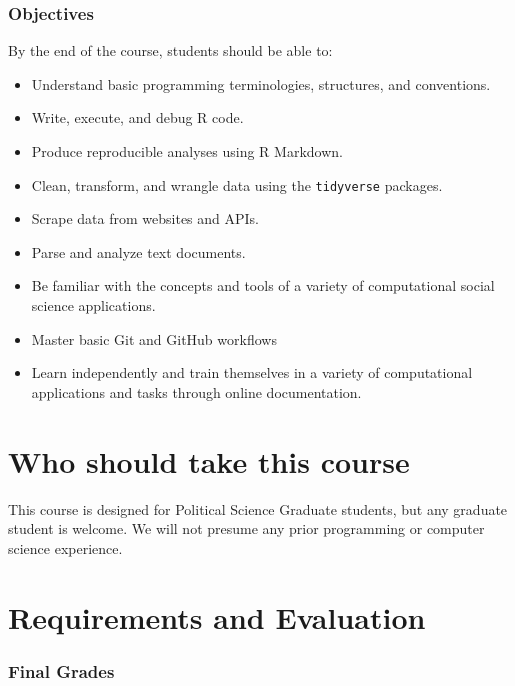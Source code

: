 \documentclass[]{book}
\providecommand{\tightlist}{%
  \setlength{\itemsep}{0pt}\setlength{\parskip}{0pt}}
\begin{document}
\hypertarget{objectives}{%
\subsubsection*{Objectives}\label{objectives}}

By the end of the course, students should be able to:

\begin{itemize}
\tightlist
\item
  Understand basic programming terminologies, structures, and conventions.
\item
  Write, execute, and debug R code.
\item
  Produce reproducible analyses using R Markdown.
\item
  Clean, transform, and wrangle data using the \texttt{tidyverse} packages.
\item
  Scrape data from websites and APIs.
\item
  Parse and analyze text documents.
\item
  Be familiar with the concepts and tools of a variety of computational social science applications.
\item
  Master basic Git and GitHub workflows
\item
  Learn independently and train themselves in a variety of computational applications and tasks through online documentation.
\end{itemize}

\hypertarget{who-should-take-this-course}{%
\section{Who should take this course}\label{who-should-take-this-course}}

This course is designed for Political Science Graduate students, but any graduate student is welcome. We will not presume any prior programming or computer science experience.

\hypertarget{requirements-and-evaluation}{%
\section{Requirements and Evaluation}\label{requirements-and-evaluation}}

\hypertarget{final-grades}{%
\subsubsection*{Final Grades}\label{final-grades}}
\end{document}
